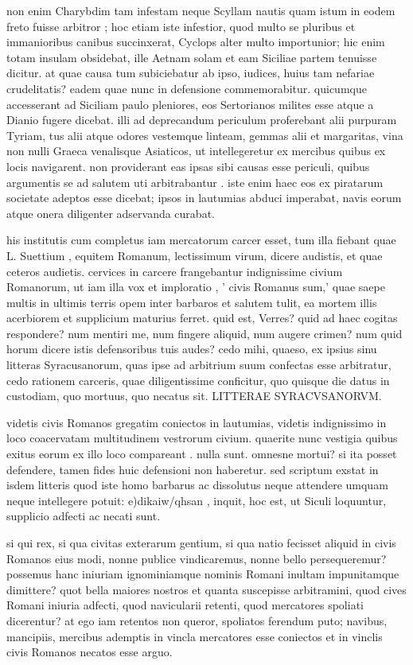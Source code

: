  non enim Charybdim tam infestam neque Scyllam nautis quam istum in eodem freto fuisse arbitror ; hoc etiam iste infestior, quod multo se pluribus et immanioribus canibus succinxerat, Cyclops alter multo importunior; hic enim totam insulam obsidebat, ille Aetnam solam et eam Siciliae partem tenuisse dicitur. at quae causa tum subiciebatur ab ipso, iudices, huius tam nefariae crudelitatis? eadem quae nunc in defensione commemorabitur. quicumque accesserant ad Siciliam paulo pleniores, eos Sertorianos milites esse atque a Dianio fugere dicebat. illi ad deprecandum periculum proferebant alii purpuram Tyriam, tus alii atque odores vestemque linteam, gemmas alii et margaritas, vina non nulli Graeca venalisque Asiaticos, ut intellegeretur ex mercibus quibus ex locis navigarent. non providerant eas ipsas sibi causas esse periculi, quibus argumentis se ad salutem uti arbitrabantur . iste enim haec eos ex piratarum societate adeptos esse dicebat; ipsos in lautumias abduci imperabat, navis eorum atque onera diligenter adservanda curabat.

 his institutis cum completus iam mercatorum carcer esset, tum illa fiebant quae L. Suettium , equitem Romanum, lectissimum virum, dicere audistis, et quae ceteros audietis. cervices in carcere frangebantur indignissime civium Romanorum, ut iam illa vox et imploratio , ' civis Romanus sum,' quae saepe multis in ultimis terris opem inter barbaros et salutem tulit, ea mortem illis acerbiorem et supplicium maturius ferret. quid est, Verres? quid ad haec cogitas respondere? num mentiri me, num fingere aliquid, num augere crimen? num quid horum dicere istis defensoribus tuis audes? cedo mihi, quaeso, ex ipsius sinu litteras Syracusanorum, quas ipse ad arbitrium suum confectas esse arbitratur, cedo rationem carceris, quae diligentissime conficitur, quo quisque die datus in custodiam, quo mortuus, quo necatus sit. LITTERAE SYRACVSANORVM.

 videtis civis Romanos gregatim coniectos in lautumias, videtis indignissimo in loco coacervatam multitudinem vestrorum civium. quaerite nunc vestigia quibus exitus eorum ex illo loco compareant . nulla sunt. omnesne mortui? si ita posset defendere, tamen fides huic defensioni non haberetur. sed scriptum exstat in isdem litteris quod iste homo barbarus ac dissolutus neque attendere umquam neque intellegere potuit: e)dikaiw/qhsan , inquit, hoc est, ut Siculi loquuntur, supplicio adfecti ac necati sunt.

 si qui rex, si qua civitas exterarum gentium, si qua natio fecisset aliquid in civis Romanos eius modi, nonne publice vindicaremus, nonne bello persequeremur? possemus hanc iniuriam ignominiamque nominis Romani inultam impunitamque dimittere? quot bella maiores nostros et quanta suscepisse arbitramini, quod cives Romani iniuria adfecti, quod navicularii retenti, quod mercatores spoliati dicerentur? at ego iam retentos non queror, spoliatos ferendum puto; navibus, mancipiis, mercibus ademptis in vincla mercatores esse coniectos et in vinclis civis Romanos necatos esse arguo.

